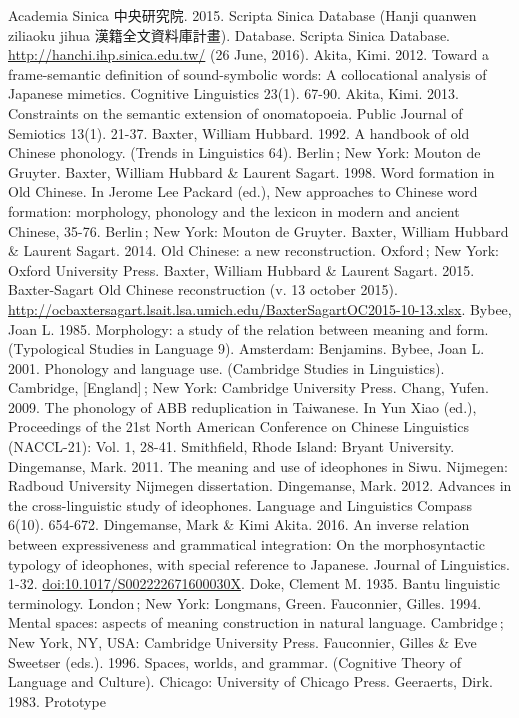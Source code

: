 Academia Sinica 中央研究院. 2015. Scripta Sinica Database (Hanji quanwen
ziliaoku jihua 漢籍全文資料庫計畫). Database. Scripta Sinica Database.
\url{http://hanchi.ihp.sinica.edu.tw/} (26 June, 2016). Akita, Kimi.
2012. Toward a frame-semantic definition of sound-symbolic words: A
collocational analysis of Japanese mimetics. Cognitive Linguistics
23(1). 67-90. Akita, Kimi. 2013. Constraints on the semantic extension
of onomatopoeia. Public Journal of Semiotics 13(1). 21-37. Baxter,
William Hubbard. 1992. A handbook of old Chinese phonology. (Trends in
Linguistics 64). Berlin\,; New York: Mouton de Gruyter. Baxter, William
Hubbard \& Laurent Sagart. 1998. Word formation in Old Chinese. In
Jerome Lee Packard (ed.), New approaches to Chinese word formation:
morphology, phonology and the lexicon in modern and ancient Chinese,
35-76. Berlin\,; New York: Mouton de Gruyter. Baxter, William Hubbard \&
Laurent Sagart. 2014. Old Chinese: a new reconstruction. Oxford\,; New
York: Oxford University Press. Baxter, William Hubbard \& Laurent
Sagart. 2015. Baxter-Sagart Old Chinese reconstruction (v. 13 october
2015).
\url{http://ocbaxtersagart.lsait.lsa.umich.edu/BaxterSagartOC2015-10-13.xlsx}.
Bybee, Joan L. 1985. Morphology: a study of the relation between meaning
and form. (Typological Studies in Language 9). Amsterdam: Benjamins.
Bybee, Joan L. 2001. Phonology and language use. (Cambridge Studies in
Linguistics). Cambridge, {[}England{]}\,; New York: Cambridge University
Press. Chang, Yufen. 2009. The phonology of ABB reduplication in
Taiwanese. In Yun Xiao (ed.), Proceedings of the 21st North American
Conference on Chinese Linguistics (NACCL-21): Vol. 1, 28-41. Smithfield,
Rhode Island: Bryant University. Dingemanse, Mark. 2011. The meaning and
use of ideophones in Siwu. Nijmegen: Radboud University Nijmegen
dissertation. Dingemanse, Mark. 2012. Advances in the cross-linguistic
study of ideophones. Language and Linguistics Compass 6(10). 654-672.
Dingemanse, Mark \& Kimi Akita. 2016. An inverse relation between
expressiveness and grammatical integration: On the morphosyntactic
typology of ideophones, with special reference to Japanese. Journal of
Linguistics. 1-32. \url{doi:10.1017/S002222671600030X}. Doke, Clement M.
1935. Bantu linguistic terminology. London\,; New York: Longmans, Green.
Fauconnier, Gilles. 1994. Mental spaces: aspects of meaning construction
in natural language. Cambridge\,; New York, NY, USA: Cambridge
University Press. Fauconnier, Gilles \& Eve Sweetser (eds.). 1996.
Spaces, worlds, and grammar. (Cognitive Theory of Language and Culture).
Chicago: University of Chicago Press. Geeraerts, Dirk. 1983. Prototype
